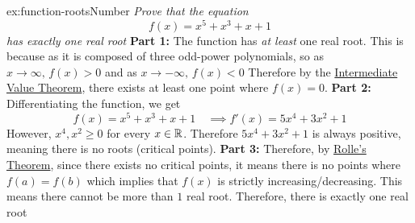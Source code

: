 \documentclass[landscape, 8pt]{extarticle}
\begin{document}
\begin{multicols}{3}
\begin{xmp}{ex:function-roots}{Number}
\textit{Prove that the equation
\[f(x) = x^5+x^3+x+1\]
has exactly one real root}
\vspace{0pt}\newline
\textbf{Part 1:} The function has \textit{at least} one real root. This is because as it is composed of three odd-power polynomials, so as $x\to\infty,\, f(x)>0$ and as $x\to-\infty,\, f(x)<0$ Therefore by the \underline{Intermediate Value Theorem}, there exists at least one point where $f(x) = 0$.
\vspace{0pt}\newline
\textbf{Part 2:} Differentiating the function, we get
\[f(x)=x^5 + x^3 + x + 1\quad\implies f'(x)=5x^4+3x^2+1\]
However, $x^4,x^2\ge 0$ for every $x\in \mathbb{R}$. Therefore $5x^4+3x^2+1$ is always positive, meaning there is no roots (critical points).
\vspace{0pt}\newline
\textbf{Part 3:} Therefore, by \underline{Rolle's Theorem}, since there exists no critical points, it means there is no points where $f(a) = f(b)$ which implies that $f(x)$ is strictly increasing/decreasing.
\vspace{0pt}\newline
This means there cannot be more than $1$ real root. Therefore, there is exactly one real root
\end{xmp}
\vspace{-5pt}



\end{multicols}
\end{document}
